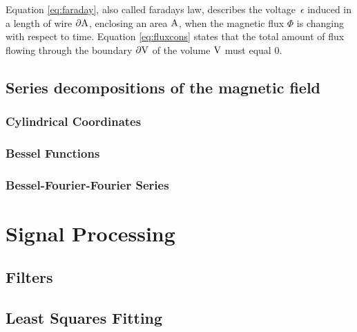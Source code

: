Equation \ref{eq:faraday}, also called faradays law, describes the voltage\
$\epsilon$ induced in a length of wire $\partial\mathrm{A}$, enclosing an area
$\mathrm{A}$, when the magnetic flux $\Phi$ is changing with respect to time.
Equation \ref{eq:fluxcons} states that the total amount of flux flowing
through the boundary $\partial\mathrm{V}$ of the volume
$\mathrm{V}$ must equal 0. \cite[Ch.4.1.1]{russenschuck2011field}

\subsection{Series decompositions of the magnetic field}
\subsubsection{Cylindrical Coordinates}
\subsubsection{Bessel Functions}
\subsubsection{Bessel-Fourier-Fourier Series}

\section{Signal Processing}
\subsection{Filters}
\subsection{Least Squares Fitting}